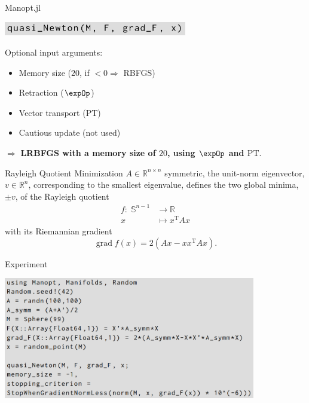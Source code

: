 \documentclass[9pt]{beamer}
\begin{document}
\begin{frame}{Manopt.jl}
    \begin{center}
        \includegraphics[width=8cm]{img/quasi_Newton_call.png} \\[.5\baselineskip]
    \end{center}
    Optional input arguments:
    \begin{itemize}
        \item Memory size ($20$, if $<0 \Rightarrow$ RBFGS)
        \item Retraction ($\expOp$)
        \item Vector transport ($\mathrm{PT}$)
        \item Cautious update (not used) \\[.5\baselineskip]
    \end{itemize}
    $\Rightarrow$ \textbf{LRBFGS with a memory size of $20$, using $\expOp$ and $\mathrm{PT}$}. 
\end{frame}

\begin{frame}{Rayleigh Quotient Minimization}
    $A \in \mathbb{R}^{n \times n}$ symmetric, the unit-norm eigenvector, $v \in \mathbb{R}^n$, corresponding to the smallest eigenvalue, defines the two global minima, $\pm v$, of the Rayleigh quotient  
    \begin{equation*}
        \begin{split}
            f \colon \; \mathbb{S}^{n-1} & \to \mathbb{R} \\
            x & \mapsto x^{\mathrm{T}} A x 
        \end{split}
    \end{equation*}   
    with its Riemannian gradient \\[.3\baselineskip]
    \begin{equation*}
        \operatorname{grad} f(x) = 2(Ax - x x^{\mathrm{T}} A x).
    \end{equation*}
\end{frame}

\begin{frame}{Experiment}
    \begin{center}
        \includegraphics[width=11cm]{img/Rayleigh.png}
    \end{center}
\end{frame}
\end{document}
